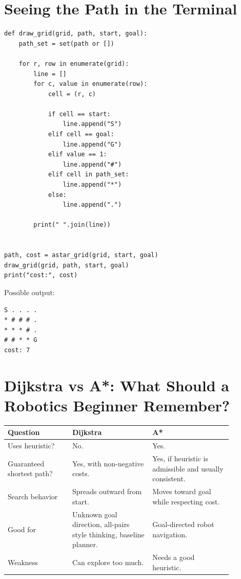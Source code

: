 \documentclass[11pt,a4paper]{article}
\begin{document}
\section{Seeing the Path in the Terminal}

\begin{lstlisting}[style=pythonstyle]
def draw_grid(grid, path, start, goal):
    path_set = set(path or [])

    for r, row in enumerate(grid):
        line = []
        for c, value in enumerate(row):
            cell = (r, c)

            if cell == start:
                line.append("S")
            elif cell == goal:
                line.append("G")
            elif value == 1:
                line.append("#")
            elif cell in path_set:
                line.append("*")
            else:
                line.append(".")

        print(" ".join(line))


path, cost = astar_grid(grid, start, goal)
draw_grid(grid, path, start, goal)
print("cost:", cost)
\end{lstlisting}

Possible output:

\begin{verbatim}
S . . . .
* # # # .
* * * # .
# # * * G
cost: 7
\end{verbatim}

\section{Dijkstra vs A*: What Should a Robotics Beginner Remember?}

\begin{center}
\begin{tabular}{>{\raggedright\arraybackslash}p{0.25\linewidth} >{\raggedright\arraybackslash}p{0.31\linewidth} >{\raggedright\arraybackslash}p{0.31\linewidth}}
\toprule
\textbf{Question} & \textbf{Dijkstra} & \textbf{A*}\\
\midrule
Uses heuristic? & No. & Yes.\\
Guaranteed shortest path? & Yes, with non-negative costs. & Yes, if heuristic is admissible and usually consistent.\\
Search behavior & Spreads outward from start. & Moves toward goal while respecting cost.\\
Good for & Unknown goal direction, all-pairs style thinking, baseline planner. & Goal-directed robot navigation.\\
Weakness & Can explore too much. & Needs a good heuristic.\\
\bottomrule
\end{tabular}
\end{center}
\end{document}
